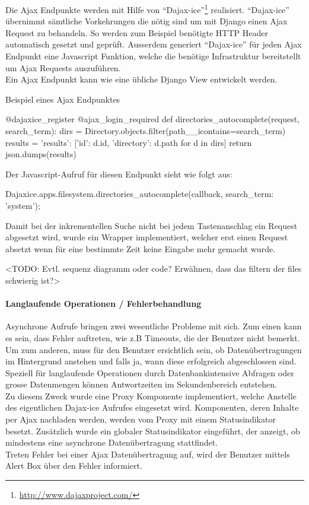Die Ajax Endpunkte werden mit Hilfe von
\enquote{Dajax-ice}\footnote{\url{http://www.dajaxproject.com/}} realisiert.
\enquote{Dajax-ice} übernimmt sämtliche Vorkehrungen die nötig sind um mit Django
einen Ajax Request zu behandeln. So werden zum Beispiel benötigte HTTP Header
automatisch gesetzt und geprüft. Ausserdem generiert \enquote{Dajax-ice} für
jeden Ajax Endpunkt eine Javascript Funktion, welche die benötige Infrastruktur bereitstellt um Ajax Requests auszuführen.
\\
Ein Ajax Endpunkt kann wie eine übliche Django View entwickelt werden.

\begin{listing}
\caption{Beispiel eines Ajax Endpunktes}
\begin{pythoncode}
@dajaxice_register
@ajax_login_required
def directories_autocomplete(request, search_term):
    dirs = Directory.objects.filter(path__icontains=search_term)
    results = {'results': [{'id': d.id, 'directory': d.path} for d in dirs]}
    return json.dumps(results)
\end{pythoncode}
\end{listing}

Der Javascript-Aufruf für diesen Endpunkt sieht wie folgt aus:

\begin{jscode}
Dajaxice.apps.filesystem.directories_autocomplete(callback, {search_term: 'system'});
\end{jscode} 

Damit bei der inkrementellen Suche nicht bei jedem Tastenanschlag ein Request
abgesetzt wird, wurde ein Wrapper implementiert, welcher erst einen Request
absetzt wenn für eine bestimmte Zeit keine Eingabe mehr gemacht wurde.

<TODO: Evtl. sequenz diagramm oder code? Erwähnen, dass das filtern der files schwierig ist?>

\paragraph{Langlaufende Operationen / Fehlerbehandlung}
Asynchrone Aufrufe bringen zwei wesentliche Probleme mit sich. Zum einen kann es sein, dass Fehler auftreten, wie z.B Timeouts, die der Benutzer nicht bemerkt. Um zum anderen, muss für den Benutzer ersichtlich sein, ob Datenübertragungen im Hintergrund anstehen und falls ja, wann diese erfolgreich abgeschlossen sind. Speziell für langlaufende Operationen durch Datenbankintensive Abfragen oder grosse Datenmengen können Antwortzeiten im Sekundenbereich entstehen. \\
Zu diesem Zweck wurde eine Proxy Komponente \cite{gamma1994design} implementiert, welche Anstelle des eigentlichen Dajax-ice Aufrufes eingesetzt wird. Komponenten, deren Inhalte per Ajax nachladen werden, werden vom Proxy mit einem Statusindikator besetzt. Zusätzlich wurde ein globaler Statusindikator eingeführt, der anzeigt, ob mindestens eine asynchrone Datenübertragung stattfindet.\\
Treten Fehler bei einer Ajax Datenübertragung auf, wird der Benutzer mittels Alert Box über den Fehler informiert.

